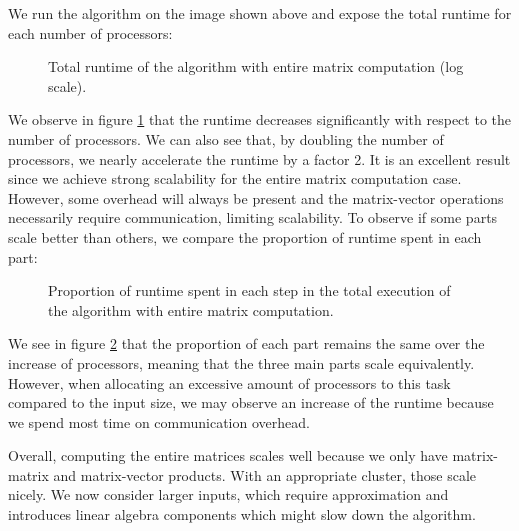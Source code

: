We run the algorithm on the image shown above and expose the total runtime for each number of processors:
\begin{figure}[H]
 \centering
 
 \caption{Total runtime of the algorithm with entire matrix computation (log scale).}
 \label{fig:entire_runtime}
\end{figure}

We observe in figure \ref{fig:entire_runtime} that the runtime decreases significantly with respect to the number of processors.
We can also see that, by doubling the number of processors, we nearly accelerate the runtime by a factor 2.
It is an excellent result since we achieve strong scalability for the entire matrix computation case.
However, some overhead will always be present and the matrix-vector operations necessarily require communication, limiting scalability.
To observe if some parts scale better than others, we compare the proportion of runtime spent in each part:
\begin{figure}[H]
 \centering
 
 \caption{Proportion of runtime spent in each step in the total execution of the algorithm with entire matrix computation.}
 \label{fig:entire_proportion}
\end{figure}

We see in figure \ref{fig:entire_proportion} that the proportion of each part remains the same over the increase of processors, meaning that the three main parts scale equivalently.
However, when allocating an excessive amount of processors to this task compared to the input size, we may observe an increase of the runtime because we spend most time on communication overhead.

Overall, computing the entire matrices scales well because we only have matrix-matrix and matrix-vector products.
With an appropriate cluster, those scale nicely.
We now consider larger inputs, which require approximation and introduces linear algebra components which might slow down the algorithm.
